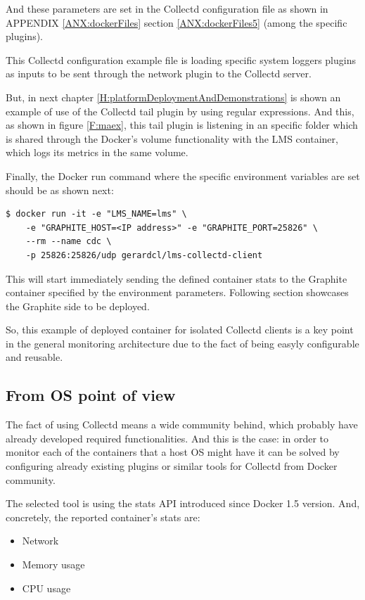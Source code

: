 And these parameters are set in the Collectd configuration file as shown in APPENDIX \ref{ANX:dockerFiles} section \ref{ANX:dockerFiles5} (among the specific plugins).

This Collectd configuration example file is loading specific system loggers plugins as inputs to be sent through the network plugin to the Collectd server.

But, in next chapter \ref{H:platformDeploymentAndDemonstrations} is shown an example of use of the Collectd tail plugin by using regular expressions. And this, as shown in figure \ref{F:maex}, this tail plugin is listening in an specific folder which is shared through the Docker's volume functionality with the LMS container, which logs its metrics in the same volume.

Finally, the Docker run command where the specific environment variables are set should be as shown next:
\begin{verbatim}
$ docker run -it -e "LMS_NAME=lms" \
	-e "GRAPHITE_HOST=<IP address>" -e "GRAPHITE_PORT=25826" \
	--rm --name cdc \
	-p 25826:25826/udp gerardcl/lms-collectd-client
\end{verbatim}

This will start immediately sending the defined container stats to the Graphite container specified by the environment parameters. Following section showcases the Graphite side to be deployed.

So, this example of deployed container for isolated Collectd clients is a key point in the general monitoring architecture due to the fact of being easyly configurable and reusable.

\subsection{From OS point of view}

The fact of using Collectd means a wide community behind, which probably have already developed required functionalities. And this is the case: in order to monitor each of the containers that a host OS might have it can be solved by configuring already existing plugins or similar tools for Collectd from Docker community. 

The selected tool is using the stats API introduced since Docker 1.5 version. And, concretely, the reported container's stats are:
 
\begin{itemize}
\item Network
\item Memory usage
\item CPU usage
\end{itemize}

